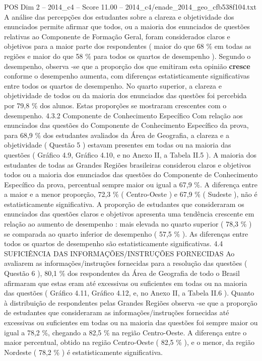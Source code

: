 \begin{textsample}{POS Dim 2 – 2014\_c4 – Score 11.00 – 2014\_c4/enade\_2014\_geo\_cfb538f104.txt}
A análise das percepções dos estudantes sobre a clareza e objetividade dos enunciados permite afirmar que todos, ou a maioria dos enunciados de questões relativas ao Componente de Formação Geral, foram considerados claros e objetivos para a maior parte dos respondentes ( maior do que 68 \% em todas as regiões e maior do que 58 \% para todos os quartos de desempenho ).
Segundo o desempenho, observa -se que a proporção dos que emitiram esta opinião \textbf{cresce} conforme o desempenho aumenta, com diferenças estatisticamente significativas entre todos os quartos de desempenho.
No quarto superior, a clareza e objetividade de todos ou da maioria dos enunciados das questões foi percebida por 79,8 \% dos alunos.
Estas proporções se mostraram crescentes com o desempenho. 4.3.2 Componente de Conhecimento Específico Com relação aos enunciados das questões do Componente de Conhecimento Específico da prova, para 68,9 \% dos estudantes avaliados da Área de Geografia, a clareza e a objetividade ( Questão 5 ) estavam presentes em todas ou na maioria das questões ( Gráfico 4.9, Gráfico 4.10, e no Anexo II, a Tabela II.5 ).
A maioria dos estudantes de todas as Grandes Regiões brasileiras considerou claros e objetivos todos ou a maioria dos enunciados das questões do Componente de Conhecimento Específico da prova, percentual sempre maior ou igual a 67,9 \%.
A diferença entre a maior e a menor proporção, 72,3 \% ( Centro-Oeste ) e 67,9 \% ( Sudeste ), não é estatisticamente significativa.
A proporção de estudantes que consideraram os enunciados das questões claros e objetivos apresenta uma tendência crescente em relação ao aumento de desempenho : mais elevada no quarto superior ( 78,3 \% ) se comparada ao quarto inferior de desempenho ( 57,5 \% ).
As diferenças entre todos os quartos de desempenho são estatisticamente significativas. 4.4 SUFICIÊNCIA DAS INFORMAÇÕES/INSTRUÇÕES FORNECIDAS Ao avaliarem as informações/instruções fornecidas para a resolução das questões ( Questão 6 ), 80,1 \% dos respondentes da Área de Geografia de todo o Brasil afirmaram que estas eram até excessivas ou suficientes em todas ou na maioria das questões ( Gráfico 4.11, Gráfico 4.12, e, no Anexo II, a Tabela II.6 ).
Quanto à distribuição de respondentes pelas Grandes Regiões observa -se que a proporção de estudantes que consideraram as informações/instruções fornecidas até excessivas ou suficientes em todas ou na maioria das questões foi sempre maior ou igual a 78,2 \%, chegando a 82,5 \% na região Centro-Oeste.
A diferença entre o maior percentual, obtido na região Centro-Oeste ( 82,5 \% ), e o menor, da região Nordeste ( 78,2 \% ) é estatisticamente significativa.

\end{textsample}
